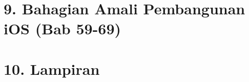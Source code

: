 \documentclass[11pt,a4paper,openany]{book}
\begin{document}
\part*{9. Bahagian Amali Pembangunan iOS (Bab 59-69)}











\appendix
\part*{10. Lampiran}









\end{document}
